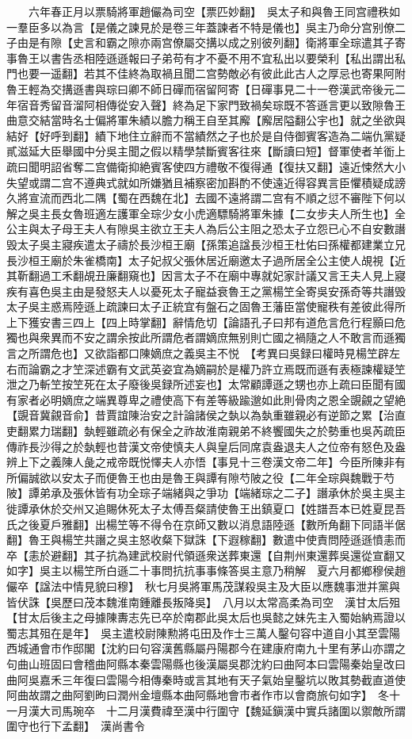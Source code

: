 　　六年春正月以票騎將軍趙儼為司空【票匹妙翻】　吳太子和與魯王同宫禮秩如一羣臣多以為言【是儀之諫見於是卷三年蓋諫者不特是儀也】吳主乃命分宫别僚二子由是有隙【史言和霸之隙亦兩宫僚屬交搆以成之别彼列翻】衛將軍全琮遣其子寄事魯王以書告丞相陸遜遜報曰子弟苟有才不憂不用不宜私出以要榮利【私出謂出私門也要一遥翻】若其不佳終為取禍且聞二宫勢敵必有彼此此古人之厚忌也寄果阿附魯王輕為交搆遜書與琮曰卿不師日磾而宿留阿寄【日磾事見二十一卷漢武帝後元二年宿音秀留音溜阿相傳從安入聲】終為足下家門致禍矣琮既不答遜言更以致隙魯王曲意交結當時名士偏將軍朱績以膽力稱王自至其廨【廨居隘翻公宇也】就之坐欲與結好【好呼到翻】績下地住立辭而不當績然之子也於是自侍御賓客造為二端仇黨疑貳滋延大臣舉國中分吳主聞之假以精學禁斷賓客往來【斷讀曰短】督軍使者羊衜上疏曰聞明詔省奪二宫備衛抑絶賓客使四方禮敬不復得通【復扶又翻】遠近悚然大小失望或謂二宫不遵典式就如所嫌猶且補察密加斟酌不使遠近得容異言臣懼積疑成謗久將宣流而西北二隅【蜀在西魏在北】去國不遠將謂二宫有不順之愆不審陛下何以解之吳主長女魯班適左護軍全琮少女小虎適驃騎將軍朱據【二女步夫人所生也】全公主與太子母王夫人有隙吳主欲立王夫人為后公主阻之恐太子立怨已心不自安數譖毁太子吳主寢疾遣太子禱於長沙桓王廟【孫策追諡長沙桓王杜佑曰孫權都建業立兄長沙桓王廟於朱雀橋南】太子妃叔父張休居近廟邀太子過所居全公主使人覘視【近其靳翻過工禾翻覘丑廉翻窺也】因言太子不在廟中專就妃家計議又言王夫人見上寢疾有喜色吳主由是發怒夫人以憂死太子寵益衰魯王之黨楊笁全寄吳安孫奇等共譖毁太子吳主惑焉陸遜上疏諫曰太子正統宜有盤石之固魯王藩臣當使寵秩有差彼此得所上下獲安書三四上【四上時掌翻】辭情危切【論語孔子曰邦有道危言危行程顥曰危獨也與衆異而不安之謂余按此所謂危者謂嫡庶無别則亡國之禍隨之人不敢言而遜獨言之所謂危也】又欲詣都口陳嫡庶之義吳主不悦　【考異曰吳録曰權時見楊笁辟左右而論霸之才笁深述霸有文武英姿宜為嫡嗣於是權乃許立焉既而遜有表極諫權疑笁泄之乃斬笁按笁死在太子廢後吳録所述妄也】太常顧譚遜之甥也亦上疏曰臣聞有國有家者必明嫡庶之端異尊卑之禮使高下有差等級踰邈如此則骨肉之恩全覬覦之望絶【覬音冀覦音俞】昔賈誼陳治安之計論諸侯之埶以為埶重雖親必有逆節之累【治直吏翻累力瑞翻】埶輕雖疏必有保全之祚故淮南親弟不終饗國失之於勢重也吳芮疏臣傳祚長沙得之於埶輕也昔漢文帝使慎夫人與皇后同席袁盎退夫人之位帝有怒色及盎辨上下之義陳人彘之戒帝既悦懌夫人亦悟【事見十三卷漢文帝二年】今臣所陳非有所偏誠欲以安太子而便魯王也由是魯王與譚有隙芍陂之役【二年全琮與魏戰于芍陂】譚弟承及張休皆有功全琮子端緒與之爭功【端緒琮之二子】譖承休於吳主吳主徙譚承休於交州又追賜休死太子太傅吾粲請使魯王出鎮夏口【姓譜吾本已姓夏昆吾氏之後夏戶雅翻】出楊笁等不得令在京師又數以消息語陸遜【數所角翻下同語半倨翻】魯王與楊笁共譖之吳主怒收粲下獄誅【下遐稼翻】數遣中使責問陸遜遜憤恚而卒【恚於避翻】其子抗為建武校尉代領遜衆送葬東還【自荆州東還葬吳還從宣翻又如字】吳主以楊笁所白遜二十事問抗抗事事條答吳主意乃稍解　夏六月都鄉穆侯趙儼卒【諡法中情見貌曰穆】　秋七月吳將軍馬茂謀殺吳主及大臣以應魏事泄并黨與皆伏誅【吳歷曰茂本魏淮南鍾離長叛降吳】　八月以太常高柔為司空　漢甘太后殂【甘太后後主之母據陳夀志先已卒於南郡此吳太后也吳懿之妹先主入蜀始納焉證以蜀志其殂在是年】　吳主遣校尉陳勲將屯田及作士三萬人鑿句容中道自小其至雲陽西城通會市作邸閣【沈約曰句容漢舊縣屬丹陽郡今在建康府南九十里有茅山亦謂之句曲山班固曰會稽曲阿縣本秦雲陽縣也後漢屬吳郡沈約曰曲阿本曰雲陽秦始皇改曰曲阿吳嘉禾三年復曰雲陽今相傳秦時或言其地有天子氣始皇鑿坑以敗其勢截直道使阿曲故謂之曲阿劉昫曰潤州金壇縣本曲阿縣地會市者作市以會商旅句如字】　冬十一月漢大司馬琬卒　十二月漢費禕至漢中行圍守【魏延鎭漢中實兵諸圍以禦敵所謂圍守也行下孟翻】　漢尚書令